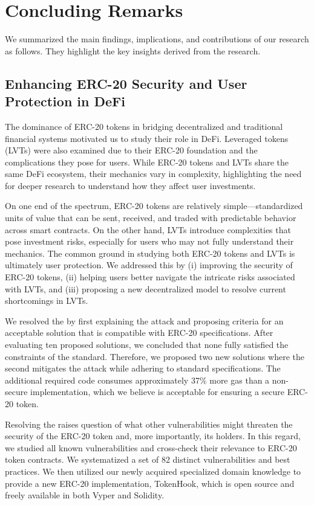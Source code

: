 
\chapter{Concluding Remarks}\label{ch:remarks}
We summarized the main findings, implications, and contributions of our research as follows. They highlight the key insights derived from the research.

\section{Enhancing ERC-20 Security and User Protection in DeFi}
The dominance of ERC-20 tokens in bridging decentralized and traditional financial systems motivated us to study their role in DeFi. Leveraged tokens (LVTs) were also examined due to their ERC-20 foundation and the complications they pose for users. While ERC-20 tokens and LVTs share the same DeFi ecosystem, their mechanics vary in complexity, highlighting the need for deeper research to understand how they affect user investments.

On one end of the spectrum, ERC-20 tokens are relatively simple—standardized units of value that can be sent, received, and traded with predictable behavior across smart contracts. On the other hand, LVTs introduce complexities that pose investment risks, especially for users who may not fully understand their mechanics. The common ground in studying both ERC-20 tokens and LVTs is ultimately user protection. We addressed this by (i) improving the security of ERC-20 tokens, (ii) helping users better navigate the intricate risks associated with LVTs, and (iii) proposing a new decentralized model to resolve current shortcomings in LVTs.

We resolved the \mwa by first explaining the attack and proposing criteria for an acceptable solution that is compatible with ERC-20 specifications. After evaluating ten proposed solutions, we concluded that none fully satisfied the constraints of the standard. Therefore, we proposed two new solutions where the second mitigates the attack while adhering to standard specifications. The additional required code consumes approximately 37\% more gas than a non-secure implementation, which we believe is acceptable for ensuring a secure ERC-20 token.

Resolving the \mwa raises question of what other vulnerabilities might threaten the security of the ERC-20 token and, more importantly, its holders. In this regard, we studied all known vulnerabilities and cross-check their relevance to ERC-20 token contracts. We systematized a set of 82 distinct vulnerabilities and best practices. We then utilized our newly acquired specialized domain knowledge to provide a new ERC-20 implementation, TokenHook, which is open source and freely available in both Vyper and Solidity.

